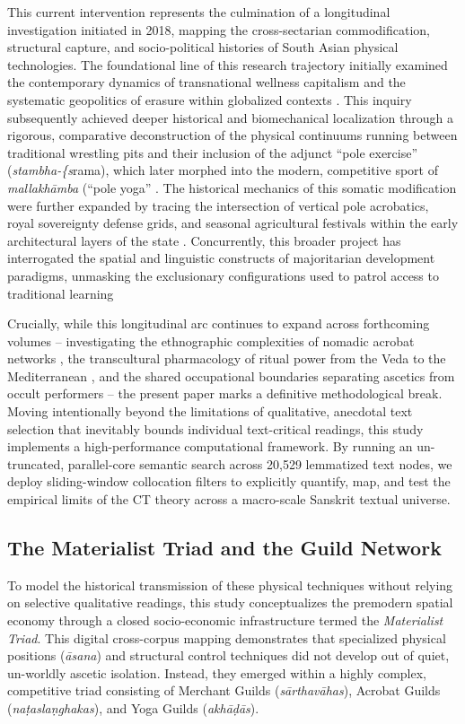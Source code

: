\documentclass[11pt,twoside,letterpaper]{article}
\begin{document}
This current intervention represents the culmination of a longitudinal investigation initiated in 2018, mapping the cross-sectarian commodification, structural capture, and socio-political histories of South Asian physical technologies. The foundational line of this research trajectory initially examined the contemporary dynamics of transnational wellness capitalism and the systematic geopolitics of erasure within globalized contexts \citep{McCartney2021}. This inquiry subsequently achieved deeper historical and biomechanical localization through a rigorous, comparative deconstruction of the physical continuums running between traditional wrestling pits and their inclusion of the adjunct ``pole exercise'' (\textit{stambha-\{s}rama), which later morphed into the modern, competitive sport of \textit{mallakhāmba} (``pole yoga''  \citep{McCartney2023}. The historical mechanics of this somatic modification were further expanded by tracing the intersection of vertical pole acrobatics, royal sovereignty defense grids, and seasonal agricultural festivals within the early architectural layers of the state \citep{McCartney2025}. Concurrently, this broader project has interrogated the spatial and linguistic constructs of majoritarian development paradigms, unmasking the exclusionary configurations used to patrol access to traditional learning \citep{McCartney2026}

Crucially, while this longitudinal arc continues to expand across forthcoming volumes -- investigating the ethnographic complexities of nomadic acrobat networks \citep{McCartneyForthcomingA}, the transcultural pharmacology of ritual power from the Veda to the Mediterranean \citep{McCartneyForthcomingB}, and the shared occupational boundaries separating ascetics from occult performers \citep{McCartneyForthcomingC} -- the present paper marks a definitive methodological break. Moving intentionally beyond the limitations of qualitative, anecdotal text selection that inevitably bounds individual text-critical readings, this study implements a high-performance computational framework. By running an un-truncated, parallel-core semantic search across 20,529 lemmatized text nodes, we deploy sliding-window collocation filters to explicitly quantify, map, and test the empirical limits of the CT theory across a macro-scale Sanskrit textual universe.


\subsection{The Materialist Triad and the Guild Network}
To model the historical transmission of these physical techniques without relying on selective qualitative readings, this study conceptualizes the premodern spatial economy through a closed socio-economic infrastructure termed the \textit{Materialist Triad}. This digital cross-corpus mapping demonstrates that specialized physical positions (\textit{āsana}) and structural control techniques did not develop out of quiet, un-worldly ascetic isolation. Instead, they emerged within a highly complex, competitive triad consisting of Merchant Guilds (\textit{sārthavāhas}), Acrobat Guilds (\textit{naṭas}\text{/}\textit{laṇghakas}), and Yoga Guilds (\textit{akhāḍās}).
\end{document}
